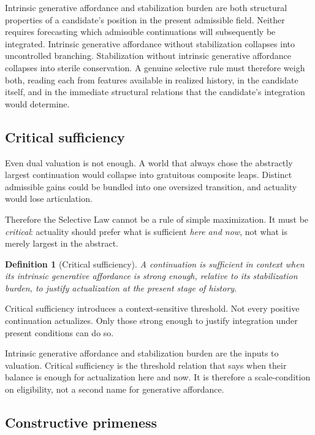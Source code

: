 \documentclass[11pt]{article}
\theoremstyle{foundation}
\newtheorem{definition}{Definition}
\begin{document}
Intrinsic generative affordance and stabilization burden are both structural properties of a candidate's position in the present admissible field. Neither requires forecasting which admissible continuations will subsequently be integrated. Intrinsic generative affordance without stabilization collapses into uncontrolled branching. Stabilization without intrinsic generative affordance collapses into sterile conservation. A genuine selective rule must therefore weigh both, reading each from features available in realized history, in the candidate itself, and in the immediate structural relations that the candidate's integration would determine.

\subsection{Critical sufficiency}

Even dual valuation is not enough. A world that always chose the abstractly largest continuation would collapse into gratuitous composite leaps. Distinct admissible gains could be bundled into one oversized transition, and actuality would lose articulation.

Therefore the Selective Law cannot be a rule of simple maximization. It must be \emph{critical}: actuality should prefer what is sufficient \emph{here and now}, not what is merely largest in the abstract.

\begin{definition}[Critical sufficiency]
A continuation is sufficient in context when its intrinsic generative affordance is strong enough, relative to its stabilization burden, to justify actualization at the present stage of history.
\end{definition}

Critical sufficiency introduces a context-sensitive threshold. Not every positive continuation actualizes. Only those strong enough to justify integration under present conditions can do so.

Intrinsic generative affordance and stabilization burden are the inputs to valuation. Critical sufficiency is the threshold relation that says when their balance is enough for actualization here and now. It is therefore a scale-condition on eligibility, not a second name for generative affordance.

\subsection{Constructive primeness}
\end{document}
